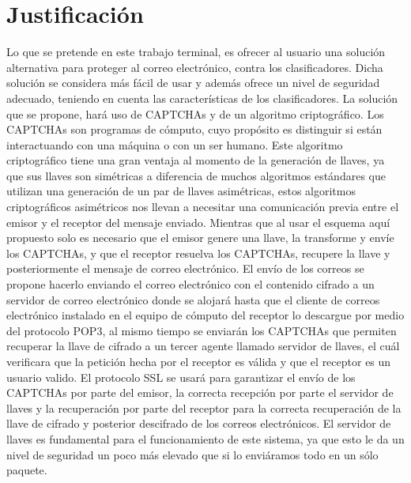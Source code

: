 \documentclass[12pt,oneside,onecolumn,openany]{report}
\begin{document}
\chapter{Justificación}
Lo que se pretende en este trabajo terminal, es ofrecer al usuario una solución alternativa para proteger al correo electrónico, contra los clasificadores. Dicha solución se considera más fácil de usar y además ofrece un nivel de seguridad adecuado, teniendo en cuenta las características de los clasificadores. La solución que se propone, hará uso de CAPTCHAs y de un algoritmo criptográfico. Los CAPTCHAs son programas de cómputo, cuyo propósito es distinguir si están interactuando con una máquina o con un ser humano. 
Este algoritmo criptográfico tiene una gran ventaja al momento de la generación de llaves, ya que sus llaves son simétricas a diferencia de muchos algoritmos estándares que utilizan una generación de un par de llaves asimétricas, estos algoritmos criptográficos asimétricos nos llevan a necesitar una comunicación previa entre el emisor y el receptor del mensaje enviado. Mientras que al usar el esquema aquí propuesto solo es necesario que el emisor genere una llave, la transforme y envíe los CAPTCHAs, y que el receptor resuelva los CAPTCHAs, recupere la llave y posteriormente el mensaje de correo electrónico.
El envío de los correos se propone hacerlo enviando el correo electrónico con el contenido cifrado a un servidor de correo electrónico donde se alojará hasta que el cliente de correos electrónico instalado en el equipo de cómputo del receptor lo descargue por medio del protocolo POP3, al mismo tiempo se enviarán los CAPTCHAs que permiten recuperar la llave de cifrado a un tercer agente llamado servidor de llaves, el cuál verificara que la petición hecha por el receptor es válida y que el receptor es un usuario valido. El protocolo SSL se usará para garantizar el envío de los CAPTCHAs por parte del emisor, la correcta recepción por parte el servidor de llaves y la recuperación por parte del receptor para la correcta recuperación de la llave de cifrado y posterior descifrado de los correos electrónicos. El servidor de llaves es fundamental para el funcionamiento de este sistema, ya que esto le da un nivel de seguridad un poco más elevado que si lo enviáramos todo en un sólo paquete.
        
\end{document}
